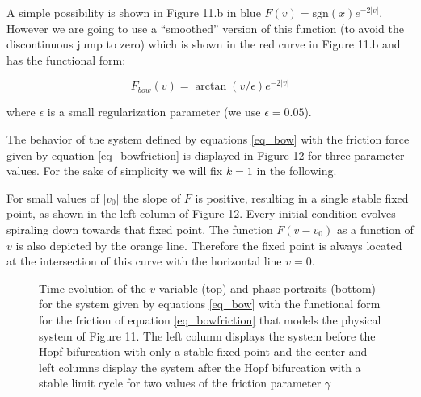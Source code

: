 \documentclass{article}
\begin{document}
A simple possibility is shown in Figure 11.b in blue $F(v) = \text{sgn}(x) e^{-2|v|}$. 
However we are going to use a “smoothed” version of this function (to avoid the discontinuous jump to zero) which is shown in the red curve in Figure 11.b and has the functional form:

\begin{equation} \label{eq_bowfriction}
    F_{bow}(v) = \arctan(v/\epsilon) e^{-2|v|} 
\end{equation}

where $\epsilon$ is a small regularization parameter (we use $\epsilon = 0.05$).

The behavior of the system defined by equations \ref{eq_bow} with the friction force given by equation \ref{eq_bowfriction} is displayed in Figure 12 for three parameter values. 
For the sake of simplicity we will fix $k=1$ in the following.

For small values of $|v_0|$ the slope of $F$ is positive, resulting in a single stable fixed point, as shown in the left column of Figure 12.
Every initial condition evolves spiraling down towards that fixed point. 
The function $F(v-v_0)$ as a function of $v$ is also depicted by the 
orange line. Therefore the fixed point is always located at the intersection of this curve with the horizontal line $v=0$.

\begin{figure}[h]
    \centering
    \caption{Time evolution of the $v$ variable (top) and phase portraits (bottom) for the system given by equations \ref{eq_bow} with the functional form for the friction of equation \ref{eq_bowfriction} that models the physical system of Figure 11. The left column displays the system before the Hopf bifurcation with only a stable fixed point and the center and left columns display the system after the Hopf bifurcation with a stable limit cycle for two values of the friction parameter $\gamma$} 
    \label{fig_bow}
\end{figure}
\end{document}
